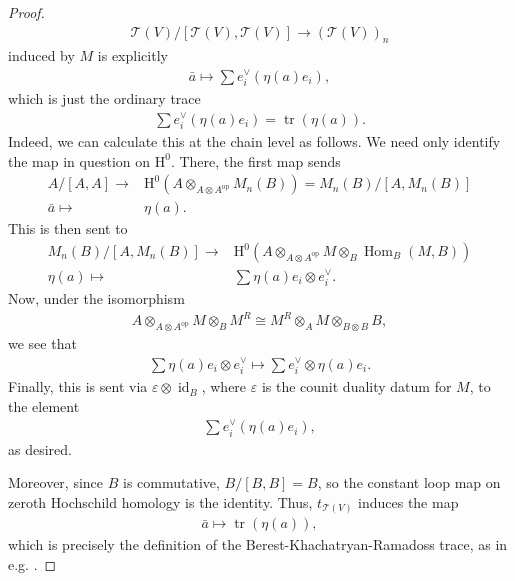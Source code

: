 \documentclass{article}
\numberwithin{equation}{section}
\theoremstyle{quest}
\theoremstyle{definition}
\theoremstyle{remark}
\DeclareMathOperator{\Hom}{Hom}
\DeclareMathOperator{\tr}{tr}
\DeclareMathOperator{\id}{id}
\begin{document}
\begin{proof}
	\begin{align*}
	 \mathscr{T}(V) /[\mathscr{T}(V),\mathscr{T}(V)]\to (\mathscr{T}(V))_n
	\end{align*}
	induced by $M$ is explicitly
	\begin{align*}
		\bar{a}\mapsto \sum e_i^\vee(\eta(a)e_i),
	\end{align*} 
	which is just the ordinary trace
	\begin{align*}
		\sum e_i^\vee(\eta(a)e_i)=\tr(\eta(a)).
	\end{align*} 
	Indeed, we can calculate this at the chain level as follows. We need only identify the map in question on $\mathrm H^0$. There, the first map sends
	\begin{align*}
		A /[A,A]\to &\mathrm H^0(A\otimes _{A\otimes A^{\text{op}}}M_n(B))=M_n(B) /[A,M_n(B)]\\
		\bar{a}\mapsto &\eta(a).
	\end{align*} 
	 This is then sent to
	 \begin{align*}
		 M_n(B) /[A,M_n(B)]\to& \mathrm H^0(A\otimes _{A\otimes A^{\text{op}}}M\otimes _B\Hom_B(M,B))\\
		 \eta(a)\mapsto &\sum\eta(a)e_i\otimes e_i^\vee.
	 \end{align*} 
	 	 Now, under the isomorphism
	 \begin{align*}
	 	A\otimes _{A\otimes A^{\text{op}}}M\otimes _BM^R\cong M^R\otimes _AM\otimes _{B\otimes B}B,
	 \end{align*} 
	 we see that 
	\begin{align*}
		\sum\eta(a)e_i\otimes e_i^\vee\mapsto \sum e_i^\vee\otimes \eta(a)e_i.
			\end{align*} 
	Finally, this is sent via $\varepsilon\otimes \id_B$, where $\varepsilon$ is the counit duality datum for $M$, to the element
	\begin{align*}
		\sum e_i^\vee(\eta(a)e_i),
	\end{align*} 
	as desired.

	Moreover, since $B$ is commutative, $B /[B,B]=B$, so the constant loop map on zeroth Hochschild homology is the identity. Thus, $t_{\mathscr{T}(V)}$ induces the map
	\begin{align*}
		\bar{a}\mapsto \tr(\eta(a)),
	\end{align*} 
	which is precisely the definition of the Berest-Khachatryan-Ramadoss trace, as in e.g. \cite[Section 3]{BR}.
\end{proof} 
	
 
 
\end{document}
